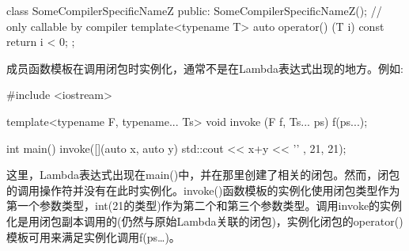 \begin{cpp}
class SomeCompilerSpecificNameZ
{
	public:
	SomeCompilerSpecificNameZ(); // only callable by compiler
	template<typename T>
	auto operator() (T i) const
	{
		return i < 0;
	}
};
\end{cpp}

成员函数模板在调用闭包时实例化，通常不是在Lambda表达式出现的地方。例如:

\begin{cpp}
#include <iostream>

template<typename F, typename... Ts> void invoke (F f, Ts... ps)
{
	f(ps...);
}

int main()
{
	invoke([](auto x, auto y) {
		std::cout << x+y << '\n'
	},
	21, 21);
}
\end{cpp}

这里，Lambda表达式出现在main()中，并在那里创建了相关的闭包。然而，闭包的调用操作符并没有在此时实例化。invoke()函数模板的实例化使用闭包类型作为第一个参数类型，int(21的类型)作为第二个和第三个参数类型。调用invoke的实例化是用闭包副本调用的(仍然与原始Lambda关联的闭包)，实例化闭包的operator()模板可用来满足实例化调用f(ps…)。













